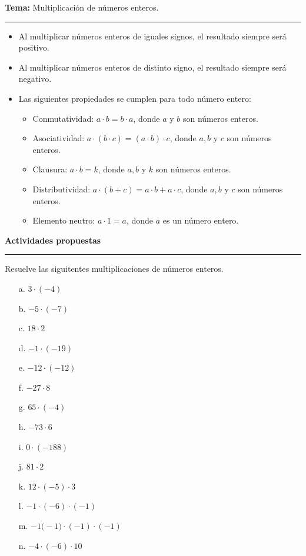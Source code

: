\documentclass[spanish,letterpaper, 11pt, addpoints, answers]{exam}
\begin{document}
\begin{questions}
\newpage
  \vspace{0.1in}
  \parbox{6in}{
  \textbf{Tema:} Multiplicación de números enteros.}
  \vspace{0.15in}
  \hrule 
  
  \begin{itemize}
    \item Al multiplicar números enteros de iguales signos, el resultado siempre será positivo.
  
    \item Al multiplicar números enteros de distinto signo, el resultado siempre será negativo.
    \item Las siguientes propiedades se cumplen para todo número entero:
    \begin{itemize}
      \item Conmutatividad: $a\cdot b=b\cdot a$, donde $a$ y $b$ son números enteros.
      \item Asociatividad: $a\cdot (b\cdot c)=(a\cdot b)\cdot c$, donde $a,b$ y $c$ son números enteros.
      \item Clausura: $a\cdot b=k$, donde $a,b$ y $k$ son números enteros.
      \item Distributividad: $a\cdot (b+c)=a\cdot b+a\cdot c$, donde $a,b$ y $c$ son números enteros.
      \item Elemento neutro: $a\cdot 1=a$, donde $a$ es un número entero. 
    \end{itemize}
    
  \end{itemize}
  
  \parbox{6in}{
  \textbf{Actividades propuestas}}
  \vspace{0.15in}
  \hrule 

  \question Resuelve las siguitentes multiplicaciones de números enteros.

  \begin{multicols}{2}
    
 
  \begin{itemize}
    \item[a.] $3\cdot (-4)$
    \item[b.] $-5\cdot (-7)$
    \item[c.] $18\cdot 2$
    \item[d.] $-1\cdot (-19)$
    \item[e.] $-12\cdot (-12)$
    \item[f.] $-27\cdot 8$
    \item[g.] $65\cdot (-4)$
    \item[h.] $-73\cdot 6$
    \item[i.] $0\cdot (-188)$
    \item[j.] $81\cdot 2$
    \item[k.] $12\cdot (-5)\cdot 3$
    \item[l.] $-1\cdot (-6)\cdot (-1)$
    \item[m.] $-1\dot (-1)\cdot (-1)\cdot (-1)$
    \item[n.] $-4\cdot (-6)\cdot 10$      
  \end{itemize}
 \end{multicols}


\end{questions}
\end{document}
